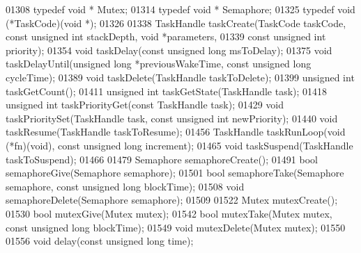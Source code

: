 \begin{DoxyCode}
01308 \textcolor{keyword}{typedef} \textcolor{keywordtype}{void} * Mutex;
01314 \textcolor{keyword}{typedef} \textcolor{keywordtype}{void} * Semaphore;
01325 \textcolor{keyword}{typedef} void (*TaskCode)(\textcolor{keywordtype}{void} *);
01326 
01338 TaskHandle taskCreate(TaskCode taskCode, \textcolor{keyword}{const} \textcolor{keywordtype}{unsigned} \textcolor{keywordtype}{int} stackDepth, \textcolor{keywordtype}{void} *parameters,
01339        \textcolor{keyword}{const} \textcolor{keywordtype}{unsigned} \textcolor{keywordtype}{int} priority);
01354 \textcolor{keywordtype}{void} taskDelay(\textcolor{keyword}{const} \textcolor{keywordtype}{unsigned} \textcolor{keywordtype}{long} msToDelay);
01375 \textcolor{keywordtype}{void} taskDelayUntil(\textcolor{keywordtype}{unsigned} \textcolor{keywordtype}{long} *previousWakeTime, \textcolor{keyword}{const} \textcolor{keywordtype}{unsigned} \textcolor{keywordtype}{long} cycleTime);
01389 \textcolor{keywordtype}{void} taskDelete(TaskHandle taskToDelete);
01399 \textcolor{keywordtype}{unsigned} \textcolor{keywordtype}{int} taskGetCount();
01411 \textcolor{keywordtype}{unsigned} \textcolor{keywordtype}{int} taskGetState(TaskHandle task);
01418 \textcolor{keywordtype}{unsigned} \textcolor{keywordtype}{int} taskPriorityGet(\textcolor{keyword}{const} TaskHandle task);
01429 \textcolor{keywordtype}{void} taskPrioritySet(TaskHandle task, \textcolor{keyword}{const} \textcolor{keywordtype}{unsigned} \textcolor{keywordtype}{int} newPriority);
01440 \textcolor{keywordtype}{void} taskResume(TaskHandle taskToResume);
01456 TaskHandle taskRunLoop(\textcolor{keywordtype}{void} (*fn)(\textcolor{keywordtype}{void}), \textcolor{keyword}{const} \textcolor{keywordtype}{unsigned} \textcolor{keywordtype}{long} increment);
01465 \textcolor{keywordtype}{void} taskSuspend(TaskHandle taskToSuspend);
01466 
01479 Semaphore semaphoreCreate();
01491 \textcolor{keywordtype}{bool} semaphoreGive(Semaphore semaphore);
01501 \textcolor{keywordtype}{bool} semaphoreTake(Semaphore semaphore, \textcolor{keyword}{const} \textcolor{keywordtype}{unsigned} \textcolor{keywordtype}{long} blockTime);
01508 \textcolor{keywordtype}{void} semaphoreDelete(Semaphore semaphore);
01509 
01522 Mutex mutexCreate();
01530 \textcolor{keywordtype}{bool} mutexGive(Mutex mutex);
01542 \textcolor{keywordtype}{bool} mutexTake(Mutex mutex, \textcolor{keyword}{const} \textcolor{keywordtype}{unsigned} \textcolor{keywordtype}{long} blockTime);
01549 \textcolor{keywordtype}{void} mutexDelete(Mutex mutex);
01550 
01556 \textcolor{keywordtype}{void} delay(\textcolor{keyword}{const} \textcolor{keywordtype}{unsigned} \textcolor{keywordtype}{long} time);

\end{DoxyCode}

